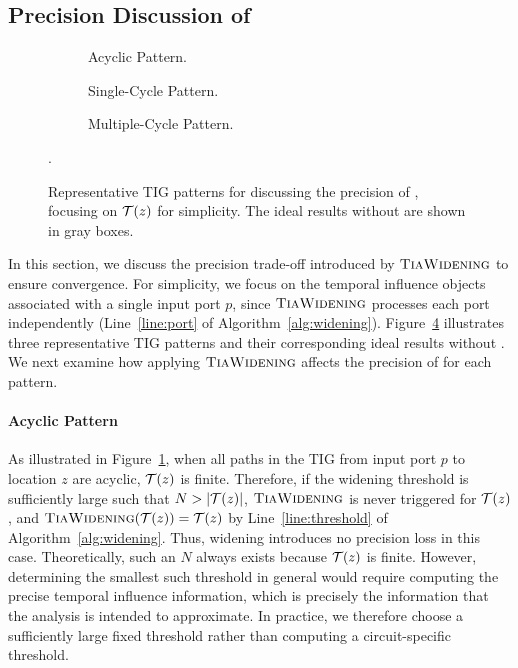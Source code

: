 \subsection{Precision Discussion of \widening}

\begin{figure}[tp]
    \hfill
    \begin{subfigure}[b]{.22\textwidth}
        \centering
        
        \caption{Acyclic Pattern.}\label{fig:acyclic-pattern}
    \end{subfigure}
    \hfill
    \begin{subfigure}[b]{.31\textwidth}
        \centering
        
        \caption{Single-Cycle Pattern.}\label{fig:single-cycle-pattern}
    \end{subfigure}
    \hfill
    \hfill
    \begin{subfigure}[b]{.32\textwidth}
        \centering
        
        \caption{Multiple-Cycle Pattern.}\label{fig:multiple-cycles-pattern}
    \end{subfigure}
    \hfill
    \caption{
        Representative TIG patterns for discussing the precision of \widening, focusing on $\mathcal{T}(z)$ for simplicity.
        The ideal \tia results without \widening are shown in gray boxes.
    }\label{fig:precision-pattern}.
\end{figure}

In this section, we discuss the precision trade-off introduced by $\textsc{TiaWidening}$ to ensure convergence.
For simplicity, we focus on the temporal influence objects associated with a single input port $p$, since $\textsc{TiaWidening}$ processes each port independently (Line~\ref{line:port} of Algorithm~\ref{alg:widening}).
Figure~\ref{fig:precision-pattern} illustrates three representative TIG patterns and their corresponding ideal \tia results without \widening.
We next examine how applying $\textsc{TiaWidening}$ affects the precision of \tia for each pattern.

\paragraph{Acyclic Pattern}

As illustrated in Figure~\ref{fig:acyclic-pattern}, when all paths in the TIG from input port $p$ to location $z$ are acyclic, $\mathcal{T}(z)$ is finite.
Therefore, if the widening threshold is sufficiently large such that $N > |\mathcal{T}(z)|$, $\textsc{TiaWidening}$ is never triggered for $\mathcal{T}(z)$, and $\textsc{TiaWidening}(\mathcal{T}(z)) = \mathcal{T}(z)$ by Line~\ref{line:threshold} of Algorithm~\ref{alg:widening}.
Thus, widening introduces no precision loss in this case.
Theoretically, such an $N$ always exists because $\mathcal{T}(z)$ is finite.
However, determining the smallest such threshold in general would require computing the precise temporal influence information, which is precisely the information that the analysis is intended to approximate.
In practice, we therefore choose a sufficiently large fixed threshold rather than computing a circuit-specific threshold.

